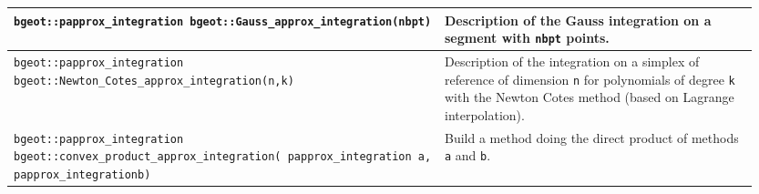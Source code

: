 \begin{center} \begin{tabular}{|m{0.55\linewidth}|m{0.4\linewidth}|} \hline
{\tt bgeot::papprox\_integration bgeot::Gauss\_approx\_integration(nbpt)} & Description of the Gauss integration on a segment with {\tt nbpt} points. \\ \hline
{\tt bgeot::papprox\_integration bgeot::Newton\_Cotes\_approx\_integration(n,\;k)} & Description of the integration on a simplex of reference of dimension {\tt n} for polynomials of degree {\tt k} with the Newton Cotes method (based on Lagrange interpolation).\\ \hline
{\tt bgeot::papprox\_integration bgeot::convex\_product\_approx\_integration( papprox\_integration a, papprox\_integration\;b)} & Build a method doing the direct product of methods {\tt a} and {\tt b}. \\ \hline
\end{tabular} \end{center}
